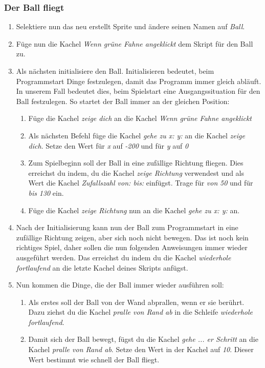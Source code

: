 \subsubsection{Der Ball fliegt}
\begin{enumerate}
\item Selektiere nun das neu erstellt Sprite und ändere seinen Namen auf \emph{Ball}.
\item Füge nun die Kachel \textit{Wenn grüne Fahne angeklickt} dem Skript für den Ball zu.
\item Als nächsten initialisiere  den Ball. 
Initialisieren bedeutet, beim Programmstart Dinge festzulegen, damit das Programm immer gleich abläuft. In unserem Fall bedeutet dies, beim Spielstart eine Ausgangssituation für den Ball festzulegen. So startet der Ball immer an der gleichen Position:
\begin{enumerate}
\item Füge die Kachel \textit{zeige dich} an die Kachel \textit{Wenn grüne Fahne angeklickt}
\item Als nächsten Befehl füge die Kachel \textit{gehe zu x: y:} an die Kachel \textit{zeige dich}. Setze den Wert für \emph{x} auf \emph{-200} und für \emph{y} auf \emph{0}
\item Zum Spielbeginn soll der Ball in eine zufällige Richtung fliegen. Dies erreichst du indem, du die Kachel \textit{zeige Richtung} verwendest und als Wert die Kachel \textit{Zufallszahl von: bis:} einfügst. Trage für \emph{von} \emph{50} und für \emph{bis} \emph{130} ein.
\item Füge die Kachel \textit{zeige Richtung} nun an die Kachel  \textit{gehe zu x: y:} an.
\end{enumerate}
\item Nach der Initialisierung kann nun der Ball zum Programmstart in eine zufällige Richtung zeigen, aber sich noch nicht bewegen. Das ist noch kein richtiges Spiel, daher sollen die nun folgenden Anweisungen immer wieder ausgeführt werden. Das erreichst du indem du die Kachel \textit{wiederhole fortlaufend} an die letzte Kachel deines Skripts anfügst. 
\item Nun kommen die Dinge, die der Ball immer wieder ausführen soll:
\begin{enumerate}
\item Als erstes soll der Ball von der Wand abprallen, wenn er sie berührt. Dazu ziehst du die Kachel \textit{pralle von Rand ab} in die Schleife \textit{wiederhole fortlaufend}. 
\item Damit sich der Ball bewegt, fügst du die Kachel \textit{gehe ... er Schritt} an die Kachel \textit{pralle von Rand ab}. Setze den Wert in der Kachel auf \emph{10}. Dieser Wert bestimmt wie schnell der Ball fliegt.  

\end{enumerate}
\end{enumerate}
